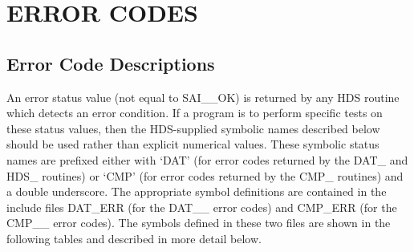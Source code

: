 \documentclass[11pt]{article}
\newcommand{\xlabel}[1]{}
\begin{document}
\newpage
\section{\xlabel{error_codes}\label{appendix:errors}ERROR CODES}

\subsection{Error Code Descriptions}

An error status value (not equal to SAI\_\_OK) is returned by any HDS routine
which detects an error condition. If a program is to perform specific tests on
these status values, then the HDS-supplied symbolic names described below
should be used rather than explicit numerical values. These symbolic status
names are prefixed either with `DAT' (for error codes returned by the DAT\_ and
HDS\_ routines) or `CMP' (for error codes returned by the CMP\_ routines) and a
double underscore. The appropriate symbol definitions are contained in the
include files DAT\_ERR (for the DAT\_\_ error codes) and CMP\_ERR (for the
CMP\_\_ error codes). The symbols defined in these two files are shown in the
following tables and described in more detail below.
\end{document}

